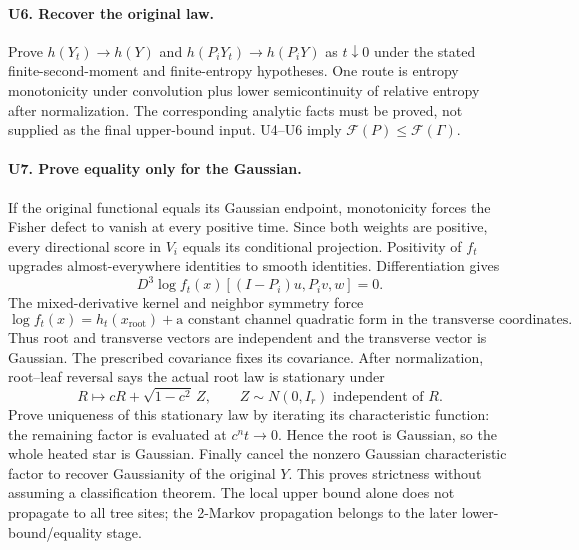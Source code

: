 \documentclass[11pt]{article}
\newcommand{\F}{\mathcal F}
\begin{document}
\paragraph{U6. Recover the original law.}
Prove $h(Y_t)\to h(Y)$ and $h(P_iY_t)\to h(P_iY)$ as $t\downarrow0$
under the stated finite-second-moment and finite-entropy hypotheses.
One route is entropy monotonicity under convolution plus lower
semicontinuity of relative entropy after normalization. The corresponding
analytic facts must be proved, not supplied as the final upper-bound input.
U4--U6 imply $\F(P)\leq\F(\Gamma)$.

\paragraph{U7. Prove equality only for the Gaussian.}
If the original functional equals its Gaussian endpoint, monotonicity
forces the Fisher defect to vanish at every positive time. Since both
weights are positive, every directional score in $V_i$ equals its
conditional projection. Positivity of $f_t$ upgrades almost-everywhere
identities to smooth identities. Differentiation gives
\[
 D^3\log f_t(x)[(I-P_i)u,P_iv,w]=0.
\]
The mixed-derivative kernel and neighbor symmetry force
\[
 \log f_t(x)=h_t(x_{\mathrm{root}})
       +\text{a constant channel quadratic form in the transverse coordinates}.
\]
Thus root and transverse vectors are independent and the transverse vector
is Gaussian. The prescribed covariance fixes its covariance.
After normalization, root--leaf reversal says the actual root law is
stationary under
\[
 R\longmapsto cR+\sqrt{1-c^2}\,Z,\qquad
 Z\sim N(0,I_r)\text{ independent of }R.
\]
Prove uniqueness of this stationary law by iterating its characteristic
function: the remaining factor is evaluated at $c^nt\to0$. Hence the root
is Gaussian, so the whole heated star is Gaussian. Finally cancel the
nonzero Gaussian characteristic factor to recover Gaussianity of the
original $Y$. This proves strictness without assuming a classification
theorem. The local upper bound alone does not propagate to all tree sites;
the 2-Markov propagation belongs to the later lower-bound/equality stage.
\end{document}
